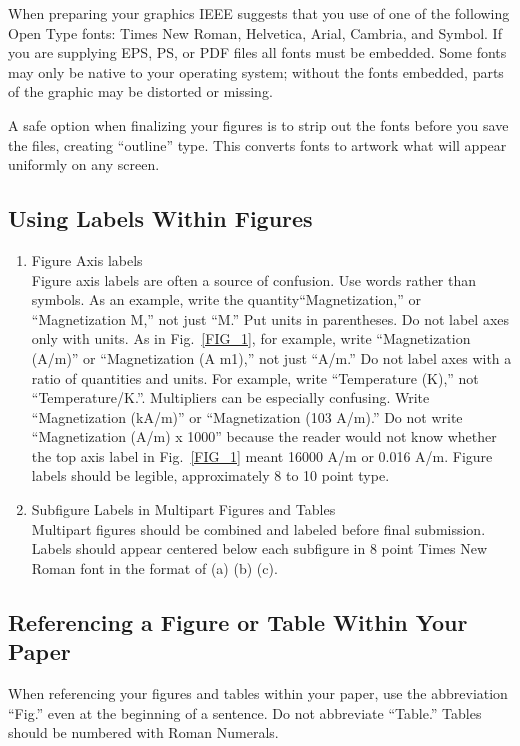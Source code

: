 \documentclass[journal]{IEEEtranTIE}
\begin{document}
When preparing your graphics IEEE suggests that you use of one of the following Open Type fonts: Times New Roman, Helvetica, Arial, Cambria, and Symbol. If you are supplying EPS, PS, or PDF files all fonts must be embedded. Some fonts may only be native to your operating system; without the fonts embedded, parts of the graphic may be distorted or missing.

A safe option when finalizing your figures is to strip out the fonts before you save the files, creating ``outline'' type. This converts fonts to artwork what will appear uniformly on any screen.


\subsection{Using Labels Within Figures}

\begin{enumerate}
	\item Figure Axis labels\\
	Figure axis labels are often a source of confusion. Use words rather than symbols. As an example, write the quantity``Magnetization,'' or ``Magnetization M,'' not just ``M.'' Put units in parentheses. Do not label axes only with units. As in \mbox{Fig. \ref{FIG_1}}, for example, write ``Magnetization (A/m)'' or ``Magnetization (A m1),'' not just ``A/m.'' Do not label axes with a ratio of quantities and units. For example, write ``Temperature (K),'' not ``Temperature/K.''. Multipliers can be especially confusing. Write ``Magnetization (kA/m)'' or ``Magnetization (103 A/m).'' Do not write ``Magnetization (A/m) x 1000'' because the reader would not know whether the top axis label in \mbox{Fig. \ref{FIG_1}} meant 16000 A/m or 0.016 A/m. Figure labels should be legible, approximately 8 to 10 point type.	
	\item Subfigure Labels in Multipart Figures and Tables\\
	Multipart figures should be combined and labeled before final submission. Labels should appear centered below each subfigure in 8 point Times New Roman font in the format of (a) (b) (c). 	
\end{enumerate}

\subsection{Referencing a Figure or Table Within Your Paper}
When referencing your figures and tables within your paper, use the abbreviation ``Fig.'' even at the beginning of a sentence. Do not abbreviate ``Table.'' Tables should be numbered with Roman Numerals.
\end{document}
